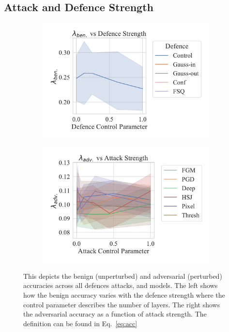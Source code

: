 \subsection{Attack and Defence Strength}
\begin{figure}
    \centering
    \begin{subfigure}{0.45\textwidth}
        \centering
        \includegraphics[width=\textwidth]{cifar/def_param_vs_accuracy.pdf}
    \end{subfigure}
    \begin{subfigure}{0.45\textwidth}
        \centering
        \includegraphics[width=\textwidth]{cifar/atk_param_vs_accuracy.pdf}
    \end{subfigure}
    \caption{This depicts the benign (unperturbed) and adversarial (perturbed) accuracies across all defences attacks, and models. The left shows how the benign accuracy varies with the defence strength where the control parameter describes the number of layers. The right shows the adversarial accuracy as a function of attack strength. The definition can be found in Eq.~\ref{eq:acc}}
    \label{fig:strength}
\end{figure}


